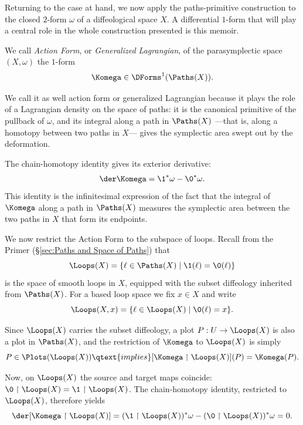 \begin{article}
  \label{art:action-form}
  Returning to the case at hand,
  we now apply the paths-primitive construction to the closed $2$-form $\omega$ of a diffeological space $X$.
  A differential $1$-form that will play a central role in the whole construction presented is this memoir.
  
  \begin{definition}
    We call \emph{Action Form},
    or \emph{Generalized Lagrangian},
    of the parasymplectic space $(X,\omega)$ the $1$-form
    \[
      \Komega \in \DForms^1(\Paths(X)).
      \]%
  \end{definition}
  
  We call it as well action form or generalized Lagrangian because it plays the role of a Lagrangian density on the space of paths:
  it is the canonical primitive of the pullback of $\omega$,
  and its integral along a path in $\Paths(X)$
  ---that is, along a homotopy between two paths in $X$---
  gives the symplectic area swept out by the deformation.
  
  The chain-homotopy identity gives its exterior derivative:
  \[
    \der\Komega = \1^*\omega - \0^*\omega.
    \]%
  This identity is the infinitesimal expression of the fact
  that the integral of $\Komega$ along a path in $\Paths(X)$
  measures the symplectic area between the two paths in $X$
  that form its endpoints.
  
  We now restrict the Action Form to the subspace of loops.
  Recall from the Primer (\S\ref{sec:Paths and Space of Paths}) that
  \[
    \Loops(X) = \{ \ell \in \Paths(X) \mid \1(\ell) = \0(\ell) \}
    \]%
  is the space of smooth loops in $X$,
  equipped with the subset diffeology inherited from $\Paths(X)$.
  For a based loop space we fix $x \in X$ and write
  \[
    \Loops(X,x) = \{ \ell \in \Loops(X) \mid \0(\ell) = x \}.
    \]%
  
  Since $\Loops(X)$ carries the subset diffeology,
  a plot $P: U \to \Loops(X)$ is also a plot in $\Paths(X)$,
  and the restriction of $\Komega$ to $\Loops(X)$ is simply
  \[
    P \in \Plots(\Loops(X)) \qtext{implies} [\Komega \restriction \Loops(X)](P) = \Komega(P).
    \]%
  
  Now, on $\Loops(X)$ the source and target maps coincide:
  $\0 \restriction \Loops(X) = \1 \restriction \Loops(X)$.
  The chain-homotopy identity,
  restricted to $\Loops(X)$,
  therefore yields
  \[
    \der[\Komega \restriction \Loops(X)]
    = (\1 \restriction \Loops(X))^*\omega
    - (\0 \restriction \Loops(X))^*\omega
    = 0.
    \]%
  

\end{article}
